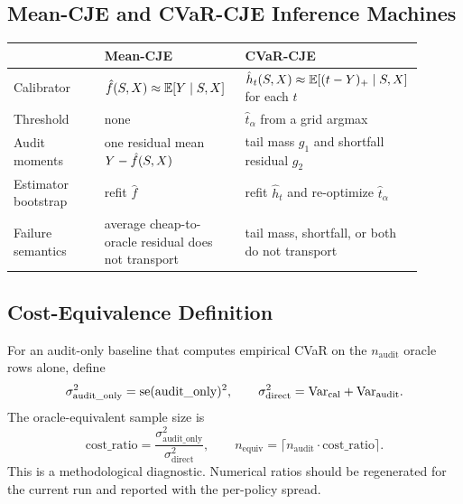 \subsection{Mean-CJE and CVaR-CJE Inference Machines}

\begin{center}
\small
\begin{tabular}{p{0.22\linewidth}p{0.34\linewidth}p{0.34\linewidth}}
\toprule
 & Mean-CJE & CVaR-CJE \\
\midrule
Calibrator &
$\hat f(S,X)\approx\mathbb{E}[Y\mid S,X]$ &
$\hat h_t(S,X)\approx\mathbb{E}[(t-Y)_+\mid S,X]$ for each $t$ \\
Threshold &
none &
$\hat t_\alpha$ from a grid argmax \\
Audit moments &
one residual mean $Y-\hat f(S,X)$ &
tail mass $g_1$ and shortfall residual $g_2$ \\
Estimator bootstrap &
refit $\hat f$ &
refit $\hat h_t$ and re-optimize $\hat t_\alpha$ \\
Failure semantics &
average cheap-to-oracle residual does not transport &
tail mass, shortfall, or both do not transport \\
\bottomrule
\end{tabular}
\end{center}

\subsection{Cost-Equivalence Definition}
\label{app:cost-equivalence}

For an audit-only baseline that computes empirical CVaR on the
$n_{\mathrm{audit}}$ oracle rows alone, define
\[
\sigma^2_{\mathrm{audit\_only}}=\mathrm{se}(\mathrm{audit\_only})^2,
\qquad
\sigma^2_{\mathrm{direct}}=\mathrm{Var}_{\mathrm{cal}}+\mathrm{Var}_{\mathrm{audit}}.
\]
The oracle-equivalent sample size is
\begin{equation}
\mathrm{cost\_ratio}
=\frac{\sigma^2_{\mathrm{audit\_only}}}{\sigma^2_{\mathrm{direct}}},
\qquad
n_{\mathrm{equiv}}
=\lceil n_{\mathrm{audit}}\cdot \mathrm{cost\_ratio}\rceil.
\label{eq:cost-equiv}
\end{equation}
This is a methodological diagnostic. Numerical ratios should be regenerated
for the current run and reported with the per-policy spread.
